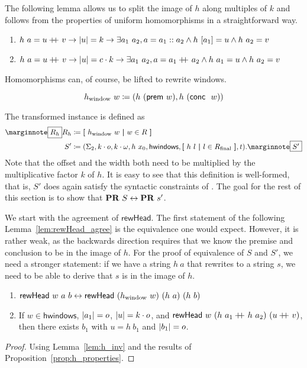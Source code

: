 The following lemma allows us to split the image of $h$ along multiples of $k$ and follows from the properties of uniform homomorphisms in a straightforward way.
\begin{lemma}[Inversion of $h$]\label{lem:h_inv}
  \begin{enumerate}
    \item $h~a = u +\kern-1.3ex+\kern0.8ex v \rightarrow |u| = k \rightarrow \exists a_1~a_2, a = a_1 :: a_2 \land h~[a_1] = u \land h~a_2 = v$
    \item $h~a = u +\kern-1.3ex+\kern0.8ex v \rightarrow |u| = c \cdot k \rightarrow \exists a_1~a_2, a = a_1 +\kern-1.3ex+\kern0.8ex a_2 \land h~a_1 = u \land h~a_2 = v$ 
  \end{enumerate}
\end{lemma}

Homomorphisms can, of course, be lifted to rewrite windows. 
\begin{definition}
  \[h_\text{window}~w\coloneqq (h~(\textsf{prem}~w), h~(\textsf{conc}~~w)) \]
\end{definition}
The transformed \PR{} instance is defined as
\begin{align*}
  \mnote{$R_h$}
  R_h &\defeq \withl h_\text{window}~w \withm w \in R \withr \\
  S' &\defeq (\Sigma_2, k \cdot o, k \cdot \omega, h~x_0, \textsf{hwindows}, \withl h~l \withm l \in \Rfinal \withr, t).
  \mnote{$S'$}
\end{align*}
Note that the offset and the width both need to be multiplied by the multiplicative factor $k$ of $h$.
It is easy to see that this definition is well-formed, that is, $S'$ does again satisfy the syntactic constraints of \PR{}.
The goal for the rest of this section is to show that $\textbf{PR}{}~S \leftrightarrow \textbf{PR}{}~s'$. 

We start with the agreement of $\textsf{rewHead}$.
The first statement of the following Lemma~\ref{lem:rewHead_agree} is the equivalence one would expect. However, it is rather weak, as the backwards direction requires that we know the premise and conclusion to be in the image of $h$.
For the proof of equivalence of $S$ and $S'$, we need a stronger statement: if we have a string $h~a$ that rewrites to a string $s$, we need to be able to derive that $s$ is in the image of $h$.

\begin{lemma}\label{lem:rewHead_agree}\leavevmode
  \begin{enumerate}
    \item $\textsf{rewHead}~w~a~b \leftrightarrow \textsf{rewHead}~(h_{\text{window}}~w)~(h~a)~(h~b)$
    \item If $w \in \textsf{hwindows}$, $|a_1| = o$, $|u| = k \cdot o$, and $\textsf{rewHead}~w~(h~a_1 +\kern-1.3ex+\kern0.8ex h~a_2)~(u +\kern-1.3ex+\kern0.8ex v)$, then there exists $b_1$ with $u = h~b_1$ and $|b_1| = o$.
  \end{enumerate}
\end{lemma}
\begin{proof}
  Using Lemma~\ref{lem:h_inv} and the results of Proposition~\ref{prop:h_properties}.
\end{proof}

